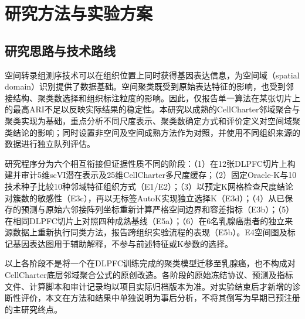\section{研究方法与实验方案}
\label{sec:cellcharter-methods-v1}

\subsection{研究思路与技术路线}
\label{subsec:cc-overview-v1}

空间转录组测序技术可以在组织位置上同时获得基因表达信息，为空间域（spatial domain）识别提供了数据基础。空间聚类既受到原始表达特征的影响，也受到邻接结构、聚类数选择和组织标注粒度的影响。因此，仅报告单一算法在某张切片上的最高ARI不足以反映实际结果的稳定性。本研究以成熟的CellCharter邻域聚合与聚类实现为基础，重点分析不同尺度表示、聚类数确定方式和评价定义对空间域聚类结论的影响；同时设置非空间及空间成熟方法作为对照，并使用不同组织来源的数据进行独立队列评估。

研究程序分为六个相互衔接但证据性质不同的阶段：（1）在12张DLPFC切片上构建并审计5维scVI潜在表示及25维CellCharter多尺度缓存；（2）固定Oracle-K与10技术种子比较10种邻域特征组织方式（E1/E2）；（3）以预定K网格检查尺度结论对簇数的敏感性（E3c），再以无标签AutoK实现独立选择K（E3d）；（4）从已保存的预测与原始六邻接阵列坐标重新计算严格空间边界和容差指标（E3b）；（5）在相同DLPFC切片上对照四种成熟基线（E5a）；（6）在6名乳腺癌患者的独立来源数据上重新执行同类方法，报告跨组织实验流程的表现（E5b）。E4空间图及标记基因表达图用于辅助解释，不参与前述特征或K参数的选择。

以上各阶段不是将一个在DLPFC训练完成的聚类模型迁移至乳腺癌，也不构成对CellCharter底层邻域聚合公式的原创改造。各阶段的原始冻结协议、预测及指标文件、计算脚本和审计记录均以项目实际归档版本为准。对实验结束后才新增的诊断性评价，本文在方法和结果中单独说明为事后分析，不将其倒写为早期已预注册的主研究终点。

